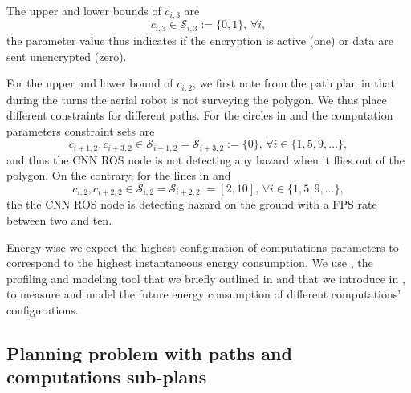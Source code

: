 The upper and lower bounds of $c_{i,3}$ are 
\begin{equation}
  c_{i,3}\in\mathcal{S}_{i,3}:=\{0,1\},\,\forall i,
\end{equation}
the parameter value thus indicates if the encryption is active (one) or data are sent unencrypted (zero).

For the upper and lower bound of $c_{i,2}$, we first note from the path plan in  that during the turns the aerial robot is not surveying the polygon. We thus place different constraints for different paths. For the circles in  and  the computation parameters constraint sets are 
\begin{equation}\label{eq:cnn-comp-const}
  c_{i+1,2},c_{i+3,2}\in\mathcal{S}_{i+1,2}=\mathcal{S}_{i+3,2}:=\{0\},\,\forall i\in\{1,5,9,\dots\},
\end{equation}
and thus the CNN ROS node is not detecting any hazard when it flies out of the polygon. On the contrary, for the lines in  and  
\begin{equation}\label{eq:encr-comp-const}
c_{i,2},c_{i+2,2}\in\mathcal{S}_{i,2}=\mathcal{S}_{i+2,2}:=[2,10],\,\forall i\in\{1,5,9,\dots\},
\end{equation} 
the the CNN ROS node is detecting hazard on the ground with a FPS rate between two and ten.

Energy-wise we expect the highest configuration of computations parameters to correspond to the highest instantaneous energy consumption. We use \powprof{}, the profiling and modeling tool that we briefly outlined in  and that we introduce in , to measure and model the future energy consumption of different computations' configurations.

\subsection{Planning problem with paths and computations sub-plans}

